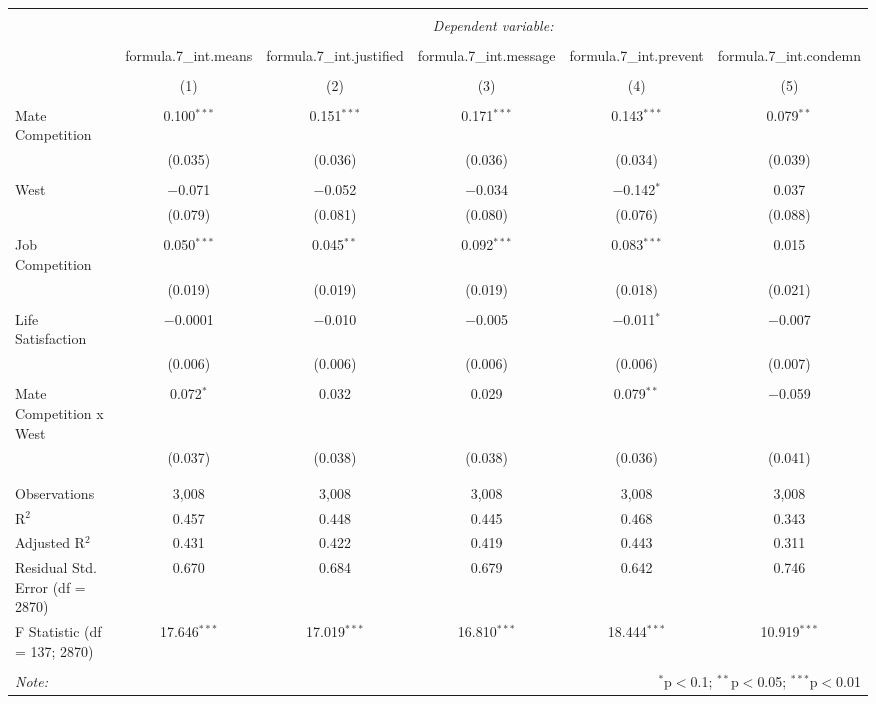 
\begin{table}[!htbp] \centering 
  \caption{} 
  \label{} 
\begin{tabular}{@{\extracolsep{5pt}}lccccc} 
\\[-1.8ex]\hline 
\hline \\[-1.8ex] 
 & \multicolumn{5}{c}{\textit{Dependent variable:}} \\ 
\cline{2-6} 
\\[-1.8ex] & formula.7\_int.means & formula.7\_int.justified & formula.7\_int.message & formula.7\_int.prevent & formula.7\_int.condemn \\ 
\\[-1.8ex] & (1) & (2) & (3) & (4) & (5)\\ 
\hline \\[-1.8ex] 
 Mate Competition & 0.100$^{***}$ & 0.151$^{***}$ & 0.171$^{***}$ & 0.143$^{***}$ & 0.079$^{**}$ \\ 
  & (0.035) & (0.036) & (0.036) & (0.034) & (0.039) \\ 
  & & & & & \\ 
 West & $-$0.071 & $-$0.052 & $-$0.034 & $-$0.142$^{*}$ & 0.037 \\ 
  & (0.079) & (0.081) & (0.080) & (0.076) & (0.088) \\ 
  & & & & & \\ 
 Job Competition & 0.050$^{***}$ & 0.045$^{**}$ & 0.092$^{***}$ & 0.083$^{***}$ & 0.015 \\ 
  & (0.019) & (0.019) & (0.019) & (0.018) & (0.021) \\ 
  & & & & & \\ 
 Life Satisfaction & $-$0.0001 & $-$0.010 & $-$0.005 & $-$0.011$^{*}$ & $-$0.007 \\ 
  & (0.006) & (0.006) & (0.006) & (0.006) & (0.007) \\ 
  & & & & & \\ 
 Mate Competition x West & 0.072$^{*}$ & 0.032 & 0.029 & 0.079$^{**}$ & $-$0.059 \\ 
  & (0.037) & (0.038) & (0.038) & (0.036) & (0.041) \\ 
  & & & & & \\ 
\hline \\[-1.8ex] 
Observations & 3,008 & 3,008 & 3,008 & 3,008 & 3,008 \\ 
R$^{2}$ & 0.457 & 0.448 & 0.445 & 0.468 & 0.343 \\ 
Adjusted R$^{2}$ & 0.431 & 0.422 & 0.419 & 0.443 & 0.311 \\ 
Residual Std. Error (df = 2870) & 0.670 & 0.684 & 0.679 & 0.642 & 0.746 \\ 
F Statistic (df = 137; 2870) & 17.646$^{***}$ & 17.019$^{***}$ & 16.810$^{***}$ & 18.444$^{***}$ & 10.919$^{***}$ \\ 
\hline 
\hline \\[-1.8ex] 
\textit{Note:}  & \multicolumn{5}{r}{$^{*}$p$<$0.1; $^{**}$p$<$0.05; $^{***}$p$<$0.01} \\ 
\end{tabular} 
\end{table} 
